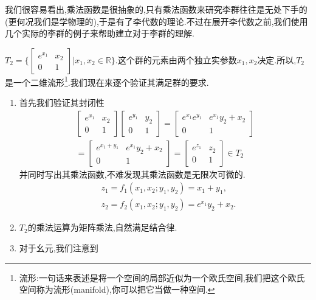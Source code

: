 我们很容易看出,乘法函数是很抽象的,只有乘法函数来研究李群往往是无处下手的(更何况我们是学物理的),于是有了李代数的理论.不过在展开李代数之前,我们使用几个实际的李群的例子来帮助建立对于李群的理解.
\begin{example}
	$T_2=\Big\{\begin{bmatrix}e^{x_1}&x_2\\0&1\end{bmatrix}\Big|x_1,x_2\in\mathbb{R}\Big\}$.这个群的元素由两个独立实参数$x_1,x_2$决定.所以,$T_2$是一个二维流形\footnote{流形:一句话来表述是将一个空间的局部近似为一个欧氏空间,我们把这个欧氏空间称为流形(manifold),你可以把它当做一种空间.}.我们现在来逐个验证其满足群的要求.
\end{example}
\begin{solution}
	\begin{enumerate}
		\item 首先我们验证其封闭性
		\begin{equation}
			\begin{gathered}\begin{bmatrix}e^{x_1}&x_2\\0&1\end{bmatrix}\begin{bmatrix}e^{y_1}&y_2\\0&1\end{bmatrix}=\begin{bmatrix}e^{x_1}e^{y_1}&e^{x_1}y_2+x_2\\0&1\end{bmatrix}\\=\begin{bmatrix}e^{x_1+y_1}&e^{x_1}y_2+x_2\\0&1\end{bmatrix}=\begin{bmatrix}e^{z_1}&z_2\\0&1\end{bmatrix}\in T_2\end{gathered}
		\end{equation}
		并同时写出其乘法函数,不难发现其乘法函数是无限次可微的.
		\begin{equation}
			\begin{aligned}&z_{1}=f_{1}(x_{1},x_{2};y_{1},y_{2})=x_{1}+y_{1},\\&z_{2}=f_{2}(x_{1},x_{2};y_{1},y_{2})=e^{x_{1}}y_{2}+x_{2}.\end{aligned}
		\end{equation}
		\item $T_2$的乘法运算为矩阵乘法,自然满足结合律.
		\item 对于幺元,我们注意到

\end{enumerate}
\end{solution}
